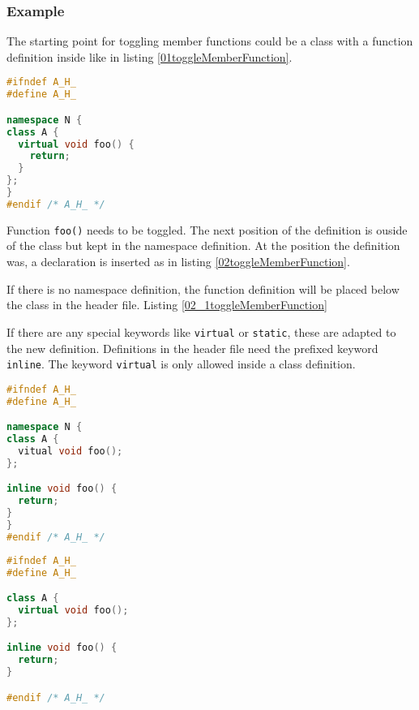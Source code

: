 \subsubsection*{Example}

The starting point for toggling member functions could be a class with a
function definition inside like in listing
\nolinebreak\ref{01toggleMemberFunction}.

\begin{lstlisting}[caption={A.h, function definition inside class declaration},
label={01toggleMemberFunction}, language=C++]
#ifndef A_H_
#define A_H_

namespace N {
class A {
  virtual void foo() {
    return;
  }
};
}
#endif /* A_H_ */
\end{lstlisting}

Function \texttt{foo()} needs to be toggled. The next position of the
definition is ouside of the class but kept in the namespace definition. At the
position the definition was, a declaration is inserted as in listing
\ref{02toggleMemberFunction}.

If there is no namespace definition, the function definition will be placed
below the class in the header file. Listing \ref{02_1toggleMemberFunction}

If there are any special keywords like \texttt{virtual} or \texttt{static},
these are adapted to the new definition. Definitions in the header file need
the prefixed keyword \texttt{inline}. The keyword \texttt{virtual}
is only allowed inside a class definition.

\begin{lstlisting}[caption={A.h, function definition outside class definition in
header}, label={02toggleMemberFunction}, language=C++]
#ifndef A_H_
#define A_H_

namespace N {
class A {
  vitual void foo();
};

inline void foo() {
  return;
}
}
#endif /* A_H_ */
\end{lstlisting}

\begin{lstlisting}[caption={A.h,
function definition outside class definition without namespace},
label={02_1toggleMemberFunction}, language=C++]
#ifndef A_H_
#define A_H_

class A {
  virtual void foo();
};

inline void foo() {
  return;
}

#endif /* A_H_ */
\end{lstlisting}

